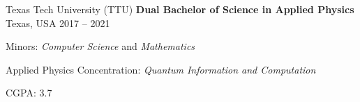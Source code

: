 
\begin{cventries}

  \cventry
  {Texas Tech University (TTU)}
  { \textbf{Dual Bachelor of Science in Applied Physics} }
    {Texas, USA}
    {2017 -- 2021}
    {
      \begin{cvitems}
      \item{Minors: \textit{Computer Science} and  \textit{Mathematics}}
      \item{Applied Physics Concentration: \textit{Quantum Information and Computation}}
        \item{CGPA: 3.7}
      \end{cvitems}
      \vspace{1em}
    }
\end{cventries}

